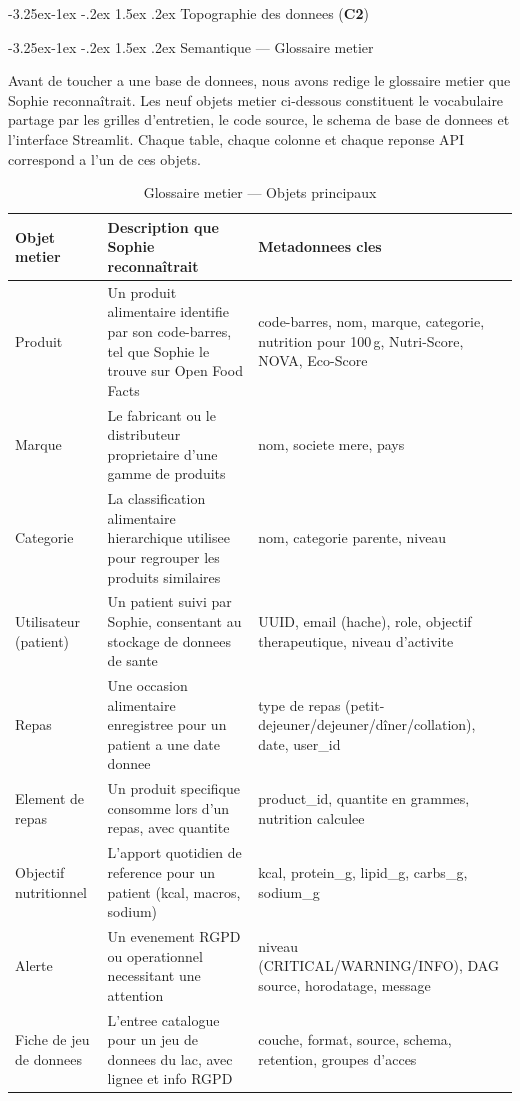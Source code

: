 \documentclass[a4paper,11pt,oneside,openany]{report}
\makeatletter
\renewcommand\subsection{\@startsection{subsection}{2}{\z@}%
  {-3.25ex\@plus -1ex \@minus -.2ex}%
  {1.5ex \@plus .2ex}%
  {\normalfont\large\bfseries\color{ntdarkgreen}}}
\renewcommand\subsubsection{\@startsection{subsubsection}{3}{\z@}%
  {-3.25ex\@plus -1ex \@minus -.2ex}%
  {1.5ex \@plus .2ex}%
  {\normalfont\normalsize\bfseries\color{ntblue}}}
\newcommand{\competence}[1]{\textbf{\textcolor{ntgreen}{#1}}}
\newcommand{\off}{Open Food Facts}
\newcommand{\rgpd}{RGPD}
\makeatother
\begin{document}
\subsection{Topographie des donnees (\competence{C2})}

\subsubsection{Semantique --- Glossaire metier}

Avant de toucher a une base de donnees, nous avons redige le glossaire
metier que Sophie reconnaîtrait. Les neuf objets metier ci-dessous
constituent le vocabulaire partage par les grilles d'entretien, le
code source, le schema de base de donnees et l'interface Streamlit.
Chaque table, chaque colonne et chaque reponse API correspond a l'un
de ces objets.

\begin{table}[H]
\centering
\caption{Glossaire metier --- Objets principaux}
\label{tab:glossary}
\begin{tabularx}{\textwidth}{L{2.5cm} L{5cm} L{5.5cm}}
\toprule
\textbf{Objet metier} & \textbf{Description que Sophie reconnaîtrait} & \textbf{Metadonnees cles} \\
\midrule
Produit & Un produit alimentaire identifie par son code-barres, tel que Sophie le trouve sur \off{} & code-barres, nom, marque, categorie, nutrition pour 100\,g, Nutri-Score, NOVA, Eco-Score \\
Marque & Le fabricant ou le distributeur proprietaire d'une gamme de produits & nom, societe mere, pays \\
Categorie & La classification alimentaire hierarchique utilisee pour regrouper les produits similaires & nom, categorie parente, niveau \\
Utilisateur (patient) & Un patient suivi par Sophie, consentant au stockage de donnees de sante & UUID, email (hache), role, objectif therapeutique, niveau d'activite \\
Repas & Une occasion alimentaire enregistree pour un patient a une date donnee & type de repas (petit-dejeuner/dejeuner/dîner/collation), date, user\_id \\
Element de repas & Un produit specifique consomme lors d'un repas, avec quantite & product\_id, quantite en grammes, nutrition calculee \\
Objectif nutritionnel & L'apport quotidien de reference pour un patient (kcal, macros, sodium) & kcal, protein\_g, lipid\_g, carbs\_g, sodium\_g \\
Alerte & Un evenement \rgpd{} ou operationnel necessitant une attention & niveau (CRITICAL/WARNING/INFO), DAG source, horodatage, message \\
Fiche de jeu de donnees & L'entree catalogue pour un jeu de donnees du lac, avec lignee et info \rgpd{} & couche, format, source, schema, retention, groupes d'acces \\
\bottomrule
\end{tabularx}
\end{table}
\end{document}
